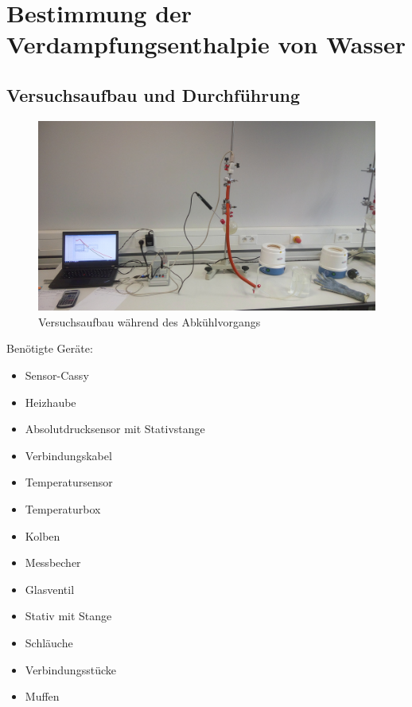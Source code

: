 \documentclass[12pt,a4paper]{article}
\begin{document}
\section{Bestimmung der Verdampfungsenthalpie von Wasser}
\subsection{Versuchsaufbau und Durchführung}
\begin{figure}[H]
\centering
\includegraphics[scale=0.1]{Bilder/IMG_20160331_121650.jpg}
\caption{Versuchsaufbau während des Abkühlvorgangs}
\end{figure}
Benötigte Geräte:
\begin{multicols}{2}
\begin{itemize}
\item Sensor-Cassy
\item Heizhaube
\item Absolutdrucksensor mit Stativstange
\item Verbindungskabel
\item Temperatursensor
\item Temperaturbox
\columnbreak
\item Kolben
\item Messbecher
\item Glasventil
\item Stativ mit Stange
\item Schläuche
\item Verbindungsstücke
\item Muffen
\end{itemize}
\end{multicols}
\end{document}
